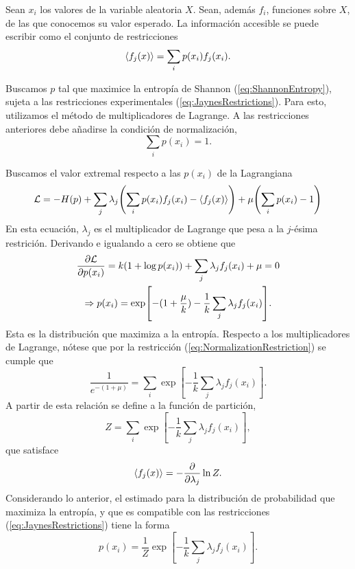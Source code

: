 
Sean $x_{i}$ los valores de la variable aleatoria $X$. Sean, además $f_{i}$, funciones sobre $X$, de las que conocemos su valor esperado. La información accesible se puede escribir como el conjunto de restricciones
\begin{equation}\label{eq:JaynesRestrictions}
    \expval{f_{j}(x)}=\sum_{i}p(x_{i})f_{j}(x_{i}).
\end{equation}


Buscamos $p$ tal que maximice la entropía de Shannon (\ref{eq:ShannonEntropy}), sujeta a las restricciones experimentales (\ref{eq:JaynesRestrictions}). Para esto, utilizamos el método de multiplicadores de Lagrange. A las restricciones anteriores debe añadirse la condición de normalización,
\begin{equation}\label{eq:NormalizationRestriction}
    \sum_{i}p(x_{i})=1.
\end{equation}

Buscamos el valor extremal respecto a las $p(x_{i})$ de la Lagrangiana
\begin{equation}
    \mathcal{L}=-H(p)+\sum_{j}\lambda_{j}\qty(\sum_{i}p(x_{i})f_{j}(x_{i})-\expval{f_{j}(x)})+\mu\qty(\sum_{i}p(x_{i})-1)\nonumber
\end{equation}
En esta ecuación, $\lambda_{j}$ es el multiplicador de Lagrange que pesa a la $j$-ésima restrición. Derivando e igualando a cero se obtiene que
\begin{gather*}
    \frac{\partial \mathcal{L}}{\partial p(x_{i})}=k(1+\log{p(x_{i})})+\sum_{j}\lambda_{j}f_{j}(x_{i})+\mu=0\\
    \Rightarrow p(x_{i})=\exp[-(1+\frac{\mu}{k})-\frac{1}{k}\sum_{j}\lambda_{j}f_{j}(x_{i})].
\end{gather*}
Esta es la distribución que maximiza a la entropía. Respecto a los multiplicadores de Lagrange, nótese que por la restricción (\ref{eq:NormalizationRestriction}) se cumple que
\begin{equation*}
    \frac{1}{e^{-(1+\mu)}}=\sum_{i}\exp[-\frac{1}{k}\sum_{j}\lambda_{j}f_{j}(x_{i})].
\end{equation*}
A partir de esta relación se define a la función de partición,
\begin{equation*}
    Z=\sum_{i}\exp[-\frac{1}{k}\sum_{j}\lambda_{j}f_{j}(x_{i})],
\end{equation*}
que satisface
\begin{equation*}
    \expval{f_{j}(x)}=-\frac{\partial}{\partial \lambda_{j}}\ln{Z}.
\end{equation*}
Considerando lo anterior, el estimado para la distribución de probabilidad que maximiza la entropía, y que es compatible con las restricciones (\ref{eq:JaynesRestrictions}) tiene la forma 
\begin{equation}\label{eq:MaxEntDist}
    p(x_{i})=\frac{1}{Z}\exp[-\frac{1}{k}\sum_{j}\lambda_{j}f_{j}(x_{i})].
\end{equation}

